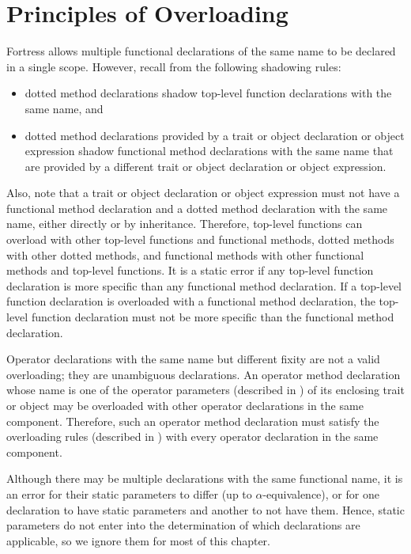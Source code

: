 \section{Principles of Overloading}

Fortress allows multiple functional declarations of the same name to
be declared in a single scope.  However, recall from 
the following shadowing rules:
\begin{itemize}
\item
dotted method declarations shadow top-level function declarations with
the same name, and
\item
dotted method declarations provided by a trait or object declaration
or object expression
shadow functional method declarations with the same name that are
provided by a different trait or object declaration
or object expression.
\end{itemize}
Also, note that a trait or object declaration
or object expression must not have a
functional method declaration and a dotted method declaration with the
same name, either directly or by inheritance.
Therefore, top-level functions can overload
with other top-level functions and functional methods,
dotted methods with other dotted methods,
and functional methods with other functional methods and top-level functions.
It is a static error if any top-level function declaration is
more specific than any functional method declaration.
If a top-level function declaration is overloaded with a functional method
declaration, the top-level function declaration must not be more specific than
the functional method declaration.


Operator declarations with the same name but different fixity
are not a valid overloading; they are unambiguous declarations.
An operator method declaration whose name is one of the operator parameters
(described in )
of its enclosing trait or object may be overloaded with other operator
declarations in the same component.
Therefore, such an operator method declaration
must satisfy the overloading rules
(described in )
with every operator declaration in the same component.


Although there may be multiple declarations
with the same functional name,
it is an error for their static parameters to differ
(up to $\alpha$-equivalence),
or for one declaration to have static parameters
and another to not have them.
Hence, static parameters do not enter into the determination of which
declarations are applicable,
so we ignore them for most of this chapter.



